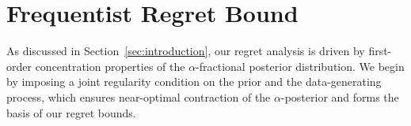 \documentclass[final,12pt]{colt2026} %
\begin{document}


\section{Frequentist Regret Bound}\label{sec:reganal}

As discussed in Section~\ref{sec:introduction}, our regret analysis is driven by first-order concentration properties of the $\alpha$-fractional posterior distribution. We begin by imposing a joint regularity condition on the prior and the data-generating process, which ensures near-optimal contraction of the $\alpha$-posterior and forms the basis of our regret bounds.
\end{document}
